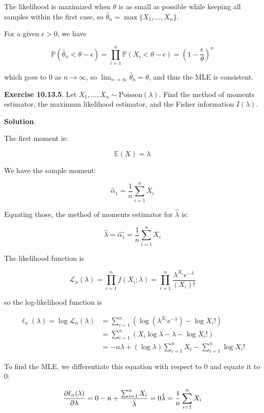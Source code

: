 The likelihood is maximized when \(\theta\) is as small as possible
while keeping all samples within the first case, so
\(\hat{\theta}_{n} = \max \{X_{1}, \dots, X_{n} \}\).

For a given \(\epsilon > 0\), we have

\[\mathbb{P}(\hat{\theta}_{n} < \theta - \epsilon) = \prod_{i=1}^{n} \mathbb{P}(X_{i} < \theta - \epsilon) = \left(1 - \frac{\epsilon}{\theta} \right)^{n}\]

which goes to 0 as \(n \rightarrow \infty\), so
\(\lim _{n \rightarrow \infty} \hat{\theta}_{n} = \theta\), and thus the
MLE is consistent.

\textbf{Exercise 10.13.5}. Let
\(X_{1}, \dots, X_{n} \sim \text{Poisson}(\lambda)\). Find the method of
moments estimator, the maximum likelihood estimator, and the Fisher
information \(I(\lambda)\).

\textbf{Solution}.

The first moment is:

\[\mathbb{E}(X) = \lambda\]

We have the sample moment:

\[\hat{\alpha}_{1} = \frac{1}{n} \sum_{i=1}^{n} X_{i}\]

Equating those, the method of moments estimator for \(\hat{\lambda}\)
is:

\[\hat{\lambda} = \hat{\alpha_{1}} = \frac{1}{n} \sum_{i=1}^{n} X_{i}\]

The likelihood function is

\[\mathcal{L}_{n}(\lambda) = \prod_{i=1}^{n} f(X_{i}; \lambda) = \prod_{i=1}^{n} \frac{\lambda^{X_{i}}e^{-\lambda}}{(X_{i})!}\]

so the log-likelihood function is

\begin{align*}
\ell_{n}(\lambda) 
  = \log \mathcal{L}_{n}(\lambda) 
& = \sum_{i=1}^{n} (\log(\lambda^{X_{i}}e^{-\lambda}) - \log X_{i}!)
\\
& = \sum_{i=1}^{n} (X_{i} \log \lambda - \lambda - \log X_{i}!)
\\
& = -n \lambda + (\log \lambda) \sum_{i=1}^{n} X_{i} - \sum_{i=1}^{n} \log X_{i}!
\end{align*}

To find the MLE, we differentiate this equation with respect to 0 and
equate it to 0:

\[ \frac{\partial \ell_{n}(\lambda)}{\partial \lambda} = 0 \\
-n + \frac{\sum_{i=1}^{n} X_{i}}{\hat{\lambda}} = 0 \\
\hat{\lambda} = \frac{1}{n} \sum_{i=1}^{n} X_{i}
\]

